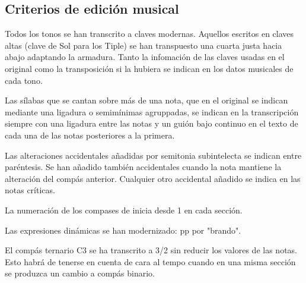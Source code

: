 \subsection*{Criterios de edición musical}
\noindent Todos los tonos se han transcrito a claves modernas. Aquellos escritos en claves altas (clave de Sol para los Tiple) se han transpuesto una cuarta justa hacia abajo adaptando la armadura. Tanto la infomación de las claves usadas en el original como la transposición si la hubiera se indican en los datos musicales de cada tono.

\noindent Las sílabas que se cantan sobre más de una nota, que en el original se indican mediante una ligadura o semimínimas agruppadas, se indican en la transcripción siempre con una ligadura entre las notas y un guión bajo continuo en el texto de cada una de las notas posteriores a la primera. 

\noindent Las alteraciones accidentales añadidas por semitonia subintelecta se indican entre paréntesis. Se han añadido también accidentales cuando la nota mantiene la alteración del compás anterior. Cualquier otro accidental añadido se indica en las notas críticas.

\noindent La numeración de los compases de inicia desde 1 en cada sección.

\noindent Las expresiones dinámicas se han modernizado: pp por "brando".


\noindent El compás ternario C3 se ha transcrito a 3/2 sin reducir los valores de las notas. Esto habrá de tenerse en cuenta de cara al tempo cuando en una misma sección se produzca un cambio a compás binario.

